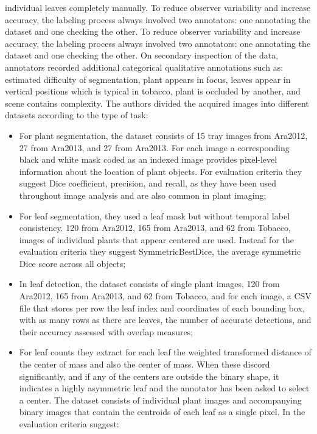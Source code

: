 individual leaves completely manually. To reduce observer variability and increase accuracy, the labeling process always involved two annotators: one annotating the
dataset and one checking the other. To reduce observer variability and increase accuracy, the labeling process always involved two annotators: one annotating the
dataset and one checking the other. On secondary inspection of the data, annotators recorded additional categorical qualitative annotations such as: estimated difficulty
of segmentation, plant appears in focus, leaves appear in vertical positions which is typical in tobacco, plant is occluded by another, and scene contains complexity.
The authors divided the acquired images into different datasets according to the type of task:
\begin{itemize}
\item For plant segmentation, the dataset consists of 15 tray images from Ara2012, 27 from Ara2013, and 27 from Ara2013. For each image a corresponding black and white
mask coded as an indexed image provides pixel-level information about the location of plant objects. For evaluation criteria they suggest Dice coefficient, precision,
and recall, as they have been used throughout image analysis and are also common in plant imaging;
\item For leaf segmentation, they used a leaf mask but without temporal label consistency. 120 from Ara2012, 165 from Ara2013, and 62 from Tobacco, images of individual
plants that appear centered are used. Instead for the evaluation criteria they suggest SymmetricBestDice, the average symmetric Dice score across all objects;
\item In leaf detection, the dataset consists of single plant images, 120 from Ara2012, 165 from Ara2013, and 62 from Tobacco, and for each image, a CSV file that
stores per row the leaf index and coordinates of each bounding box, with as many rows as there are leaves, the number of accurate detections, and their accuracy
assessed with overlap measures;
\item For leaf counts they extract for each leaf the weighted transformed distance of the center of mass and also the center of mass. When these discord significantly, 
and if any of the centers are outside the binary shape, it indicates a highly asymmetric leaf and the annotator has been asked to select a center. The dataset consists
of individual plant images and accompanying binary images that contain the centroids of each leaf as a single pixel. In the evaluation criteria suggest:
\begin{itemize}

\end{itemize}
\end{itemize}
